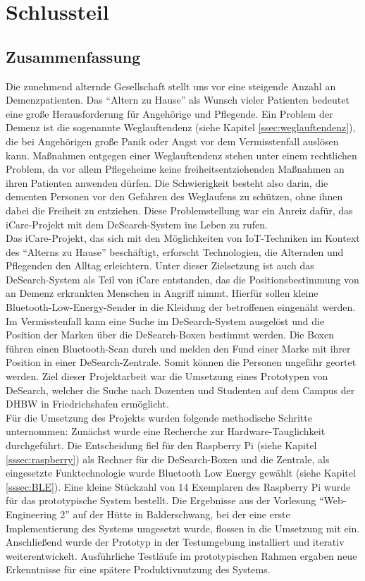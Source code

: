 \section{Schlussteil}
\subsection{Zusammenfassung}
Die zunehmend alternde Gesellschaft stellt uns vor eine steigende Anzahl an Demenzpatienten. Das \enquote{Altern zu Hause} als Wunsch vieler Patienten bedeutet eine große Herausforderung für Angehörige und Pflegende. Ein Problem der Demenz ist die sogenannte Weglauftendenz (siehe Kapitel \ref{ssec:weglauftendenz}), die bei Angehörigen große Panik oder Angst vor dem Vermisstenfall auslösen kann. Maßnahmen entgegen einer Weglauftendenz stehen unter einem rechtlichen Problem, da vor allem Pflegeheime keine freiheitsentziehenden Maßnahmen an ihren Patienten anwenden dürfen. Die Schwierigkeit besteht also darin, die dementen Personen vor den Gefahren des Weglaufens zu schützen, ohne ihnen dabei die Freiheit zu entziehen. Diese Problemstellung war ein Anreiz dafür, das iCare-Projekt mit dem DeSearch-System ins Leben zu rufen.\\
Das iCare-Projekt, das sich mit den Möglichkeiten von IoT-Techniken im Kontext des \enquote{Alterns zu Hause} beschäftigt, erforscht Technologien, die Alternden und Pflegenden den Alltag erleichtern. Unter dieser Zielsetzung ist auch das DeSearch-System als Teil von iCare entstanden, das die Positionsbestimmung von an Demenz erkrankten Menschen in Angriff nimmt.  Hierfür sollen kleine Bluetooth-Low-Energy-Sender in die Kleidung der betroffenen eingenäht werden. Im Vermisstenfall kann eine Suche im DeSearch-System ausgelöst und die Position der Marken über die DeSearch-Boxen bestimmt werden. Die Boxen führen einen Bluetooth-Scan durch und melden den Fund einer Marke mit ihrer Position in einer DeSearch-Zentrale. Somit können die Personen ungefähr geortet werden. Ziel dieser Projektarbeit war die Umsetzung eines Prototypen von DeSearch, welcher die Suche nach Dozenten und Studenten auf dem Campus der DHBW in Friedrichshafen ermöglicht.\\
Für die Umsetzung des Projekts wurden folgende methodische Schritte unternommen: Zunächst wurde eine Recherche zur Hardware-Tauglichkeit durchgeführt. Die Entscheidung fiel für den Raspberry Pi (siehe Kapitel \ref{sssec:raspberry}) als Rechner für die DeSearch-Boxen und die Zentrale, als eingesetzte Funktechnologie wurde Bluetooth Low Energy gewählt (siehe Kapitel \ref{sssec:BLE}). Eine kleine Stückzahl von 14 Exemplaren des Raspberry Pi wurde für das prototypische System bestellt. Die Ergebnisse aus der Vorlesung \enquote{Web-Engineering 2} auf der Hütte in Balderschwang, bei der eine erste Implementierung des Systems umgesetzt wurde, flossen in die Umsetzung mit ein. Anschließend wurde der Prototyp in der Testumgebung installiert und iterativ weiterentwickelt. Ausführliche Testläufe im prototypischen Rahmen ergaben neue Erkenntnisse für eine spätere Produktivnutzung des Systems.\\
